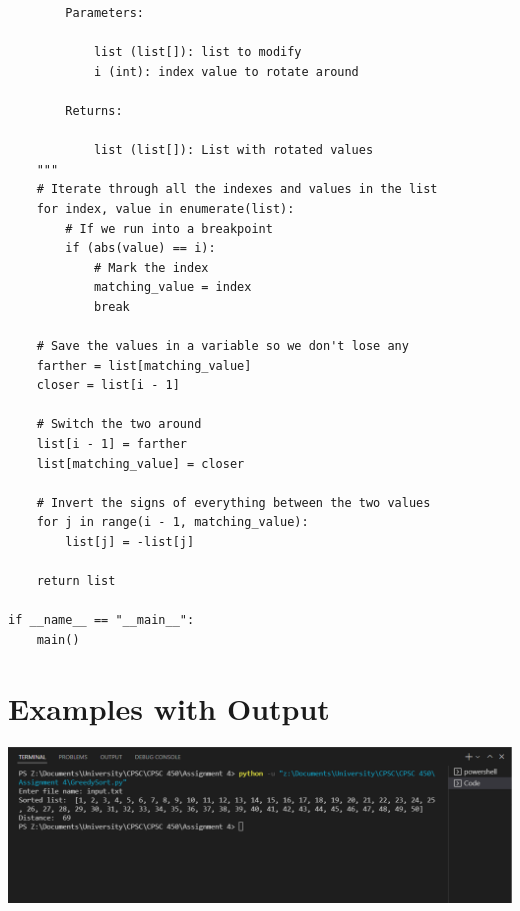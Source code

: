 \documentclass{article}
\begin{document}
\begin{lstlisting}
        Parameters:

            list (list[]): list to modify
            i (int): index value to rotate around

        Returns:

            list (list[]): List with rotated values
    """
    # Iterate through all the indexes and values in the list
    for index, value in enumerate(list):
        # If we run into a breakpoint
        if (abs(value) == i):
            # Mark the index
            matching_value = index
            break

    # Save the values in a variable so we don't lose any
    farther = list[matching_value]
    closer = list[i - 1]

    # Switch the two around
    list[i - 1] = farther
    list[matching_value] = closer

    # Invert the signs of everything between the two values
    for j in range(i - 1, matching_value):
        list[j] = -list[j]

    return list

if __name__ == "__main__":
    main()

\end{lstlisting}

\section*{Examples with Output}
\includegraphics[scale=0.445]{ExampleInput1.png}\\
\end{document}
